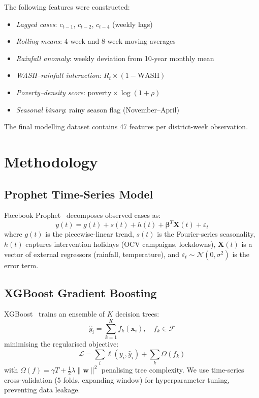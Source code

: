 \documentclass[conference]{IEEEtran}
\begin{document}
The following features were constructed:
\begin{itemize}
    \item \textit{Lagged cases}: $c_{t-1}$, $c_{t-2}$, $c_{t-4}$ (weekly lags)
    \item \textit{Rolling means}: 4-week and 8-week moving averages
    \item \textit{Rainfall anomaly}: weekly deviation from 10-year monthly mean
    \item \textit{WASH–rainfall interaction}: $R_t \times (1 - \text{WASH})$
    \item \textit{Poverty–density score}: $\text{poverty} \times \log(1 + \rho)$
    \item \textit{Seasonal binary}: rainy season flag (November–April)
\end{itemize}

The final modelling dataset contains 47 features per district-week observation.


\section{Methodology}
\label{sec:methods}

\subsection{Prophet Time-Series Model}

Facebook Prophet~\cite{taylor2018forecasting} decomposes observed cases as:
\begin{equation}
    y(t) = g(t) + s(t) + h(t) + \boldsymbol{\beta}^T \mathbf{X}(t) + \varepsilon_t
    \label{eq:prophet}
\end{equation}
where $g(t)$ is the piecewise-linear trend, $s(t)$ is the Fourier-series
seasonality, $h(t)$ captures intervention holidays (OCV campaigns, lockdowns),
$\mathbf{X}(t)$ is a vector of external regressors (rainfall, temperature), and
$\varepsilon_t \sim \mathcal{N}(0,\sigma^2)$ is the error term.

\subsection{XGBoost Gradient Boosting}

XGBoost~\cite{chen2016xgboost} trains an ensemble of $K$ decision trees:
\begin{equation}
    \hat{y}_i = \sum_{k=1}^{K} f_k(\mathbf{x}_i), \quad f_k \in \mathcal{F}
    \label{eq:xgb}
\end{equation}
minimising the regularised objective:
\begin{equation}
    \mathcal{L} = \sum_i \ell(y_i, \hat{y}_i) + \sum_k \Omega(f_k)
    \label{eq:xgb_loss}
\end{equation}
with $\Omega(f) = \gamma T + \frac{1}{2}\lambda\|\mathbf{w}\|^2$ penalising
tree complexity. We use time-series cross-validation (5 folds, expanding window)
for hyperparameter tuning, preventing data leakage.
\end{document}
